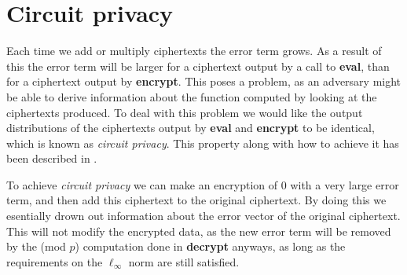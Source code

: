 \documentclass[../main.tex]{subfiles}
\begin{document}
\section{Circuit privacy}
Each time we add or multiply ciphertexts the error term grows.
As a result of this the error term will be larger for a ciphertext output by a call to \textbf{eval}, than for a ciphertext output by \textbf{encrypt}.
This poses a problem, as an adversary might be able to derive information about the function computed by looking at the ciphertexts produced.
To deal with this problem we would like the output distributions of the ciphertexts output by \textbf{eval} and \textbf{encrypt} to be identical, which is known as \textit{circuit privacy}.
This property along with how to achieve it has been described in \cite{gentry2009fully}.

To achieve \textit{circuit privacy} we can make an encryption of $0$ with a very large error term, and then add this ciphertext to the original ciphertext.
By doing this we esentially drown out information about the error vector of the original ciphertext.
This will not modify the encrypted data, as the new error term will be removed by the (mod $p$) computation done in \textbf{decrypt} anyways, as long as the requirements on the $\ell_\infty$ norm are still satisfied.
\end{document}
